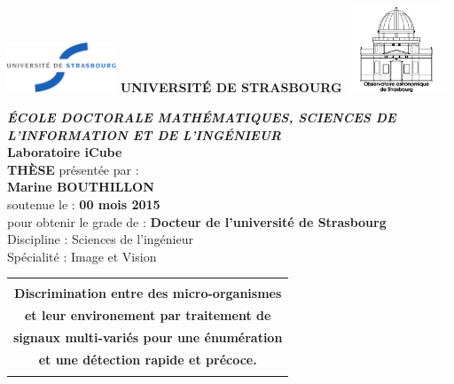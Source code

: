
\begin{titlepage}
\hspace{-2cm}
\includegraphics[height = 1.5cm] {Cover/unistra_logo}\hspace{0.3cm}
\LARGE{\textbf{\uppercase{Université de Strasbourg}}}\hspace{0.5cm}
\includegraphics[width = 3cm] {Cover/logo-obs}
\begin{center}
	\vspace{1.5cm}
	\large{\textbf{\uppercase{\textit{\'{E}cole doctorale Mathématiques, Sciences de l'Information et de l'ingénieur}}}}\\
	\large{\textbf{Laboratoire iCube}}\\
	\vspace{2.5cm}
	\huge{\uppercase{\bf Thèse}} \normalsize présentée par :\\
	\Large{\textbf{Marine BOUTHILLON}}\\
	\normalsize soutenue le : \textbf{00 mois 2015}\\
	\vspace{2cm}
	pour obtenir le grade de : \Large \textbf{Docteur de l'université de Strasbourg}\\
	\normalsize Discipline : Sciences de l'ingénieur\\
	Spécialité : Image et Vision\\
	\vspace{1cm}
	\begin{tabular}{|c|}
		\hline
		\\
		\LARGE{\textbf{Discrimination entre des micro-organismes }} \\
		\LARGE{\textbf{et leur environement par traitement de }} \\
		\LARGE{\textbf{signaux multi-variés pour une énumération}} \\
		\LARGE{\textbf{et une détection rapide et précoce.}} \\
		\\\hline
	\end{tabular}
\end{center}


\end{titlepage}
